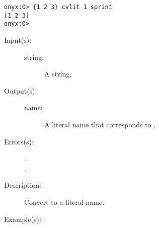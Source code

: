 \begin{description}
\begin{description}
\begin{verbatim}
onyx:0> {1 2 3} cvlit 1 sprint
[1 2 3]
onyx:0>
		\end{verbatim}
	\end{description}
\label{systemdict:cvn}
\item[{\onyxop{string}{cvn}{name}}: ]
	\begin{description}\item[]
	\item[Input(s): ]
		\begin{description}\item[]
		\item[string: ]
			A string.
		\end{description}
	\item[Output(s): ]
		\begin{description}\item[]
		\item[name: ]
			A literal name that corresponds to .
		\end{description}
	\item[Errors(s): ]
		\begin{description}\item[]
		\item[.]
		\item[.]
		\end{description}
	\item[Description: ]
		Convert  to a literal name.
	\item[Example(s): ]\begin{verbatim}


\end{verbatim}
\end{description}
\end{description}
